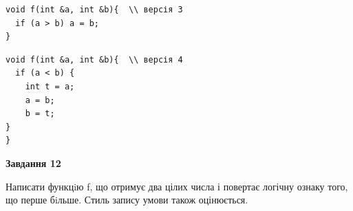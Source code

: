 \documentclass[12pt, ukrainian]{article}
\begin{document}
{\begin {large}
\begin{minipage}[t]{11.0cm}
\vspace{-8mm}\begin{verbatim}
void f(int &a, int &b){  \\ версія 3
  if (a > b) a = b;
}
\end{verbatim}

\vspace{-8mm}\begin{verbatim}
void f(int &a, int &b){  \\ версія 4
  if (a < b) {
    int t = a;
    a = b;
    b = t;
}  
}
\end{verbatim}



\begin{center}
\textbf{Завдання 12}
\end{center}

Написати функцiю f, що отримує два цілих числа і повертає логічну ознаку того, що перше бiльше. Стиль запису умови також оцінюється.\par

\end{minipage}

\end {large}}
\newpage
\end{document}
